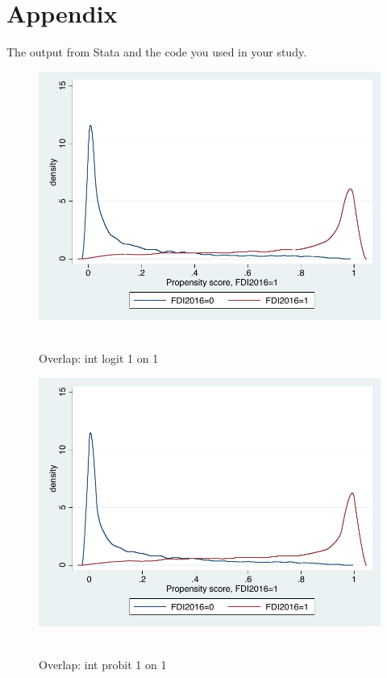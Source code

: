 \documentclass[11pt,a4paper,leqno]{article}
\begin{document}
\nocite{chen2011}
\clearpage



\appendix
\section*{Appendix}
The output from Stata and the code you used in your study.

\begin{figure}
	\centering
	\includegraphics[scale=0.6]{figures_and_tables/3_overlap_intlogit1o1.pdf}\
	\caption{Overlap: int logit 1 on 1 }
	\label{ol_intlog1}
\end{figure}

\begin{figure}
	\centering
	\includegraphics[scale=0.6]{figures_and_tables/3_overlap_intprobit1o1.pdf}\
	\caption{Overlap: int probit 1 on 1 }
	\label{ol_intprob1}
\end{figure}
\end{document}
